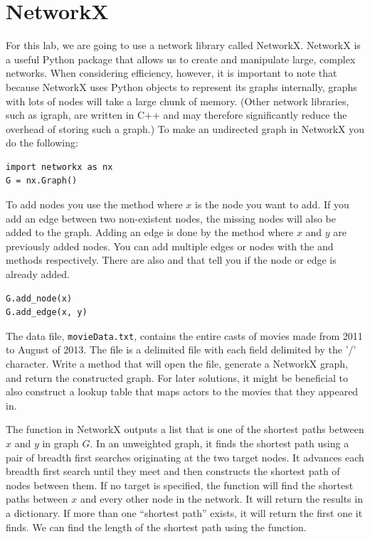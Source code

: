 \section*{NetworkX}
For this lab, we are going to use a network library called NetworkX. NetworkX is a useful Python package that allows us to create and manipulate large, complex networks.  When considering efficiency, however, it is important to note that because NetworkX uses Python objects to represent its graphs internally, graphs with lots of nodes will take a large chunk of memory.  (Other network libraries, such as igraph, are written in C++ and may therefore significantly reduce the overhead of storing such a graph.) 
To make an undirected graph in NetworkX you do the following:
\begin{lstlisting}
import networkx as nx
G = nx.Graph()
\end{lstlisting}
To add nodes you use the  method where $x$ is the node you want to add.  If you add an edge between two non-existent nodes, the missing nodes will also be added to the graph. Adding an edge is done by the  method where $x$ and $y$ are previously added nodes. You can add multiple edges or nodes with the  and  methods respectively.  There are also  and  that tell you if the node or edge is already added.
\begin{lstlisting}
G.add_node(x)
G.add_edge(x, y)
\end{lstlisting}

\begin{problem}
The data file, \texttt{movieData.txt}, contains the entire casts of movies made from 2011 to August of 2013. The file is a delimited file with each field delimited by the '/' character.
Write a method that will open the file, generate a NetworkX graph, and return the constructed graph.
For later solutions, it might be beneficial to also construct a lookup table that maps actors to the movies that they appeared in.
\end{problem}

The  function in NetworkX outputs a list that is one of the shortest paths between $x$ and $y$ in graph $G$.  In an unweighted graph, it finds the shortest path using a pair of breadth first searches originating at the two target nodes.  It advances each breadth first search until they meet and then  constructs the shortest path of nodes between them.  If no target is specified, the function will find the shortest paths between $x$ and every other node in the network.  It will return the results in a dictionary.  If more than one ``shortest path'' exists, it will return the first one it finds.  We can find the length of the shortest path using the  function.

